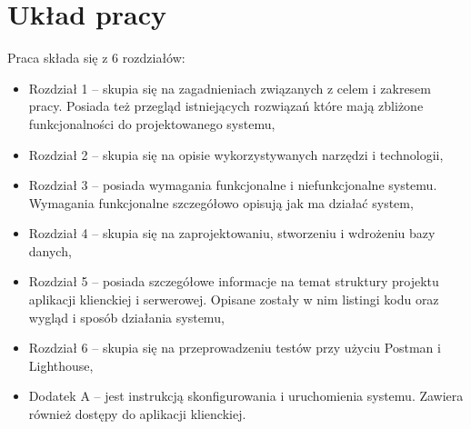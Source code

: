 \section{Układ pracy}
Praca składa się z 6 rozdziałów:
\begin {itemize}
	\item Rozdział 1 -- skupia się na zagadnieniach związanych z celem i zakresem pracy. Posiada też przegląd istniejących rozwiązań które mają zbliżone funkcjonalności do projektowanego systemu,
	\item Rozdział 2 -- skupia się na opisie wykorzystywanych narzędzi i technologii,
	\item Rozdział 3 -- posiada wymagania funkcjonalne i niefunkcjonalne systemu. Wymagania funkcjonalne szczegółowo opisują jak ma działać system,
	\item Rozdział 4 -- skupia się na zaprojektowaniu, stworzeniu i wdrożeniu bazy danych,
	\item Rozdział 5 -- posiada szczegółowe informacje na temat struktury projektu aplikacji klienckiej i serwerowej. Opisane zostały w nim listingi kodu oraz wygląd i sposób działania systemu,
	\item Rozdział 6 -- skupia się na przeprowadzeniu testów przy użyciu Postman i Lighthouse,
	\item Dodatek A -- jest instrukcją skonfigurowania i uruchomienia systemu. Zawiera również dostępy do aplikacji klienckiej.
\end{itemize}


